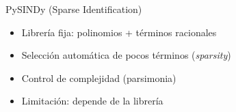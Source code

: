 \documentclass[10pt, aspectratio=169]{beamer}
\begin{document}
\begin{frame}{PySINDy (Sparse Identification)}
\begin{center}
\begin{tikzpicture}
\end{tikzpicture}
\end{center}

\vspace{0.15cm}

\begin{itemize}
    \item Librería fija: polinomios + términos racionales
    \item Selección automática de pocos términos (\textit{sparsity})
    \item Control de complejidad (parsimonia)
    \item Limitación: depende de la librería
\end{itemize}

\end{frame}
\end{document}
